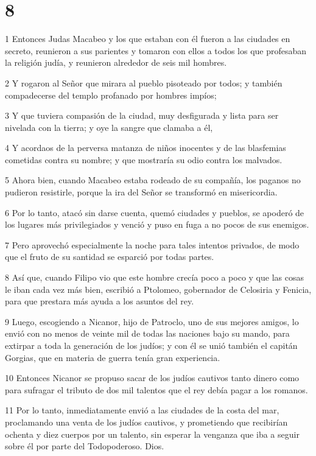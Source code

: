 \chapter{8}

\par 1 Entonces Judas Macabeo y los que estaban con él fueron a las ciudades en secreto, reunieron a sus parientes y tomaron con ellos a todos los que profesaban la religión judía, y reunieron alrededor de seis mil hombres.
\par 2 Y rogaron al Señor que mirara al pueblo pisoteado por todos; y también compadecerse del templo profanado por hombres impíos;
\par 3 Y que tuviera compasión de la ciudad, muy desfigurada y lista para ser nivelada con la tierra; y oye la sangre que clamaba a él,
\par 4 Y acordaos de la perversa matanza de niños inocentes y de las blasfemias cometidas contra su nombre; y que mostraría su odio contra los malvados.
\par 5 Ahora bien, cuando Macabeo estaba rodeado de su compañía, los paganos no pudieron resistirle, porque la ira del Señor se transformó en misericordia.
\par 6 Por lo tanto, atacó sin darse cuenta, quemó ciudades y pueblos, se apoderó de los lugares más privilegiados y venció y puso en fuga a no pocos de sus enemigos.
\par 7 Pero aprovechó especialmente la noche para tales intentos privados, de modo que el fruto de su santidad se esparció por todas partes.
\par 8 Así que, cuando Filipo vio que este hombre crecía poco a poco y que las cosas le iban cada vez más bien, escribió a Ptolomeo, gobernador de Celosiria y Fenicia, para que prestara más ayuda a los asuntos del rey.
\par 9 Luego, escogiendo a Nicanor, hijo de Patroclo, uno de sus mejores amigos, lo envió con no menos de veinte mil de todas las naciones bajo su mando, para extirpar a toda la generación de los judíos; y con él se unió también el capitán Gorgias, que en materia de guerra tenía gran experiencia.
\par 10 Entonces Nicanor se propuso sacar de los judíos cautivos tanto dinero como para sufragar el tributo de dos mil talentos que el rey debía pagar a los romanos.
\par 11 Por lo tanto, inmediatamente envió a las ciudades de la costa del mar, proclamando una venta de los judíos cautivos, y prometiendo que recibirían ochenta y diez cuerpos por un talento, sin esperar la venganza que iba a seguir sobre él por parte del Todopoderoso. Dios.
